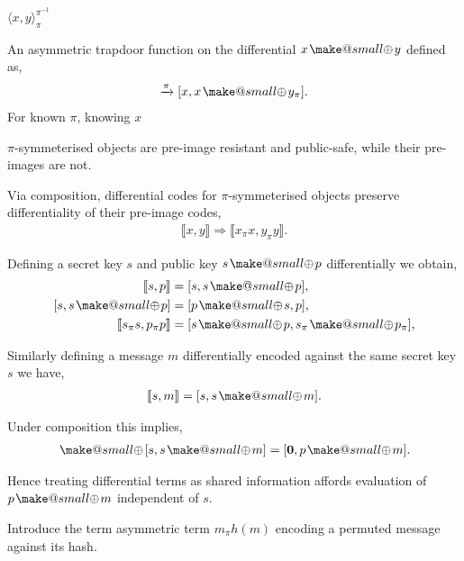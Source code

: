 \documentclass[twocolumn, aps, amsmath, amssymb, nofootinbib, superscriptaddress, longbibliography, doublefloatfix, table-of-contents, eqsecnum, rmp]{revtex4-2}
\makeatletter
\def\diff#1#2{\llbracket #1,#2\rrbracket}
\def\braid#1#2#3#4{\langle#1,#2\rangle_{#3}^{#4}}
\newcommand{\soplus}{{{\hspace{1pt}}{\mathbin{\mathpalette\make@small{\mathbin\oplus}}}}{\hspace{1pt}}}
\newcommand{\make@small}[2]{%
  \vcenter{\hbox{%
    \scalebox{0.6}{$\m@th#1#2$}%
  }}%
}
\makeatother
\begin{document}
$\braid{x}{y}{\pi}{\pi^{-1}}$


An asymmetric trapdoor function on the differential $x\soplus y$ defined as,
\begin{align}
	[x,x\soplus y] \xrightarrow{\pi} [x, x \soplus y_\pi].
\end{align}
For known $\pi$, knowing $x$

$\pi$-symmeterised objects are pre-image resistant and public-safe, while their pre-images are not.

Via composition, differential codes for $\pi$-symmeterised objects preserve differentiality of their pre-image codes,
\begin{align}
	\diff{x}{y} \Rightarrow \diff{x_\pi x}{y_\pi y}.
\end{align}

Defining a secret key $s$ and public key $s\soplus p$ differentially we obtain,
\begin{align}
	\diff{s}{p} &= [s, s\soplus p],\nonumber\\
	[s, s\soplus p] &= [p\soplus s, p],\nonumber\\
	\diff{s_\pi s}{p_\pi p} &= [s\soplus p, s_\pi\soplus p_\pi],\nonumber\\
\end{align}

Similarly defining a message $m$ differentially encoded against the same secret key $s$ we have,
\begin{align}
	\diff{s}{m} = [s,s\soplus m].
\end{align}

Under composition this implies,
\begin{align}
	[s,s\soplus p] \soplus [s,s\soplus m] = [\mathbf{0},p\soplus m].	
\end{align}

Hence treating differential terms as shared information affords evaluation of $p\soplus m$ independent of $s$.

Introduce the term asymmetric term $m_\pi h(m)$ encoding a permuted message against its hash.

\end{document}
